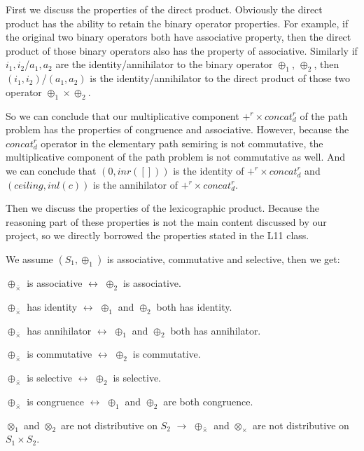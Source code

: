 \documentclass[a4paper,10pt]{article}
\begin{document}
First we discuss the properties of the direct product. Obviously the direct product has the ability to retain the binary operator properties. For example, if the original two binary operators both have associative property, then the direct product of those binary operators also has the property of associative. Similarly if $i_1,i_2$/$a_1,a_2$ are the identity/annihilator to the binary operator $\oplus_1$, $\oplus_2$, then $(i_1,i_2)$/$(a_1,a_2)$ is the identity/annihilator to the direct product of those two operator $\oplus_1 \times \oplus_2$.

So we can conclude that our multiplicative component $+^r \times concat^r_d$ of the path problem has the properties of congruence and associative. However, because the $concat^r_d$ operator in the elementary path semiring is not commutative, the multiplicative component of the path problem is not commutative as well. And we can conclude that $(0,inr([]))$ is the identity of $+^r \times concat^r_d$ and $(ceiling,inl(c))$ is the annihilator of $+^r \times concat^r_d$.


Then we discuss the properties of the lexicographic product.
Because the reasoning part of these properties is not the main content discussed by our project, so we directly borrowed the properties stated in the L11 class.

We assume $(S_1,\oplus_1)$ is associative, commutative and selective, then we get:

\begin{center}
$\oplus_{\bar{\times}}$ is associative $\longleftrightarrow$ $\oplus_2$ is associative.

$\oplus_{\bar{\times}}$ has identity $\longleftrightarrow$ $\oplus_1$ and $\oplus_2$ both has identity.

$\oplus_{\bar{\times}}$ has annihilator $\longleftrightarrow$ $\oplus_1$ and $\oplus_2$ both has annihilator.

$\oplus_{\bar{\times}}$ is commutative $\longleftrightarrow$ $\oplus_2$ is commutative.

$\oplus_{\bar{\times}}$ is selective $\longleftrightarrow$ $\oplus_2$ is selective.

$\oplus_{\bar{\times}}$ is congruence $\longleftrightarrow$ $\oplus_1$ and $\oplus_2$ are both congruence.

$\otimes_1$ and $\otimes_2$ are not distributive on $S_2$ $\longrightarrow$ $\oplus_{\bar{\times}}$ and  $\otimes_\times$ are not distributive on $S_1 \times S_2$.

\end{center}
\end{document}
